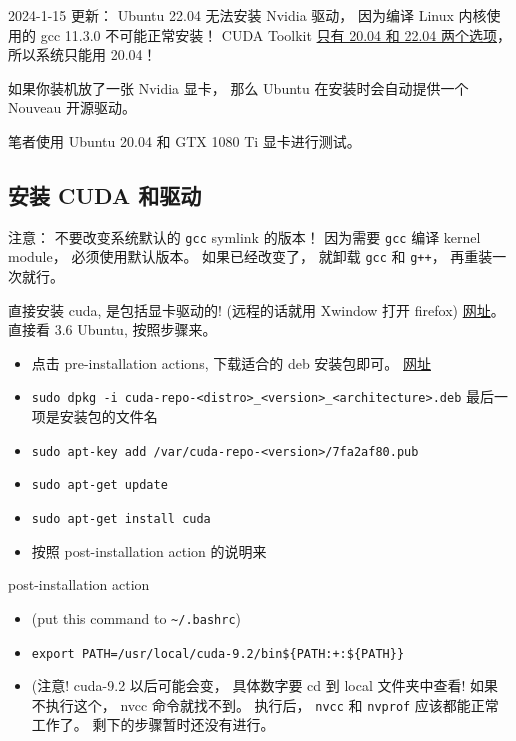 
2024-1-15 更新： Ubuntu 22.04 无法安装 Nvidia 驱动， 因为编译 Linux 内核使用的 gcc 11.3.0 不可能正常安装！ CUDA Toolkit \href{https://developer.nvidia.com/cuda-downloads?target_os=Linux&target_arch=x86_64&Distribution=Ubuntu}{只有 20.04 和 22.04 两个选项}， 所以系统只能用 20.04！

如果你装机放了一张 Nvidia 显卡， 那么 Ubuntu 在安装时会自动提供一个 Nouveau 开源驱动。

笔者使用 Ubuntu 20.04 和 GTX 1080 Ti 显卡进行测试。

\subsection{安装 CUDA 和驱动}
注意： 不要改变系统默认的 \verb`gcc` symlink 的版本！ 因为需要 \verb`gcc` 编译 kernel module， 必须使用默认版本。 如果已经改变了， 就卸载 \verb`gcc` 和 \verb`g++`， 再重装一次就行。

直接安装 cuda, 是包括显卡驱动的! (远程的话就用 Xwindow 打开 firefox)
\href{https://docs.nvidia.com/cuda/cuda-installation-guide-linux/index.html#ubuntu-installation}{网址}。 直接看 3.6 Ubuntu, 按照步骤来。
\begin{itemize}
\item 点击 pre-installation actions, 下载适合的 deb 安装包即可。 \href{https://developer.nvidia.com/cuda-downloads}{网址}
\item \verb`sudo dpkg -i cuda-repo-<distro>_<version>_<architecture>.deb`   最后一项是安装包的文件名
\item \verb`sudo apt-key add /var/cuda-repo-<version>/7fa2af80.pub`
\item \verb`sudo apt-get update`
\item \verb`sudo apt-get install cuda`
\item 按照 post-installation action 的说明来
\end{itemize}

post-installation action
\begin{itemize}
\item (put this command to \verb`~/.bashrc`)
\item \verb`export PATH=/usr/local/cuda-9.2/bin${PATH:+:${PATH}}`
\item (注意! cuda-9.2 以后可能会变， 具体数字要 cd 到 local 文件夹中查看!
如果不执行这个， nvcc 命令就找不到。 执行后， \verb`nvcc` 和 \verb`nvprof` 应该都能正常工作了。
剩下的步骤暂时还没有进行。
\end{itemize}

